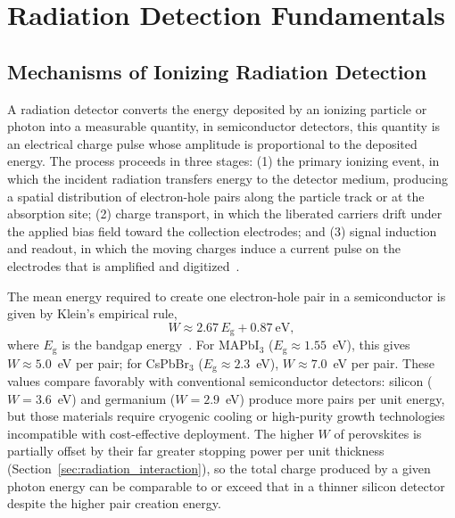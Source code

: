 \section{Radiation Detection Fundamentals}
\label{sec:detection_fundamentals}

\subsection{Mechanisms of Ionizing Radiation Detection}

A radiation detector converts the energy deposited by an ionizing particle
or photon into a measurable quantity, in semiconductor detectors, this
quantity is an electrical charge pulse whose amplitude is proportional to
the deposited energy.  The process proceeds in three stages: (1) the
primary ionizing event, in which the incident radiation transfers energy
to the detector medium, producing a spatial distribution of electron-hole
pairs along the particle track or at the absorption site; (2) charge
transport, in which the liberated carriers drift under the applied bias
field toward the collection electrodes; and (3) signal induction and
readout, in which the moving charges induce a current pulse on the
electrodes that is amplified and digitized~\cite{knoll2010}.

The mean energy required to create one electron-hole pair in a
semiconductor is given by Klein's empirical rule,
\begin{equation}
  W \approx 2.67\,E_{\mathrm{g}} + 0.87~\text{eV},
  \label{eq:klein}
\end{equation}
where $E_{\mathrm{g}}$ is the bandgap energy~\cite{Klein1968}.  For
MAPbI$_3$ ($E_{\mathrm{g}} \approx 1.55$~eV), this gives $W \approx 5.0$~eV
per pair; for CsPbBr$_3$ ($E_{\mathrm{g}} \approx 2.3$~eV), $W \approx 7.0$~eV
per pair.  These values compare favorably with conventional semiconductor
detectors: silicon ($W = 3.6$~eV) and germanium ($W = 2.9$~eV) produce
more pairs per unit energy, but those materials require cryogenic cooling
or high-purity growth technologies incompatible with cost-effective
deployment.  The higher $W$ of perovskites is partially offset by their
far greater stopping power per unit thickness (Section~\ref{sec:radiation_interaction}),
so the total charge produced by a given photon energy can be comparable
to or exceed that in a thinner silicon detector despite the higher pair
creation energy.

